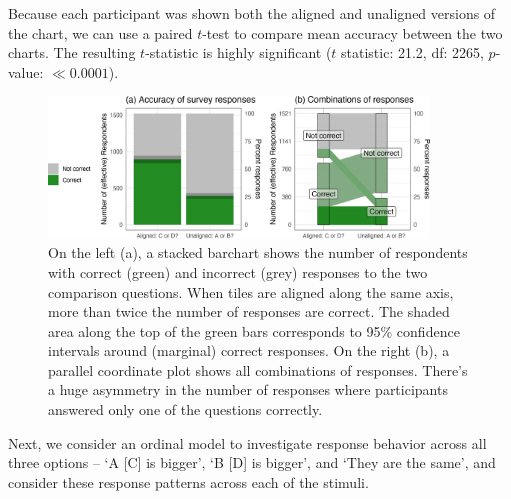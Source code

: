 \documentclass[
]{jds}
\begin{document}
Because each participant was shown both the aligned and unaligned
versions of the chart, we can use a paired \(t\)-test to compare mean
accuracy between the two charts. The resulting \(t\)-statistic is highly
significant (\(t\) statistic: 21.2, df: 2265, \(p\)-value:
\(\ll 0.0001\)).

\begin{figure}[hbt]

{\centering \includegraphics[width=0.9\textwidth,height=\textheight]{./figures/fig-alignment-1.png}

}

\caption{\label{fig-alignment}On the left (a), a stacked barchart shows
the number of respondents with correct (green) and incorrect (grey)
responses to the two comparison questions. When tiles are aligned along
the same axis, more than twice the number of responses are correct. The
shaded area along the top of the green bars corresponds to 95\%
confidence intervals around (marginal) correct responses. On the right
(b), a parallel coordinate plot shows all combinations of responses.
There's a huge asymmetry in the number of responses where participants
answered only one of the questions correctly.}

\end{figure}

Next, we consider an ordinal model to investigate response behavior
across all three options -- `A {[}C{]} is bigger', `B {[}D{]} is
bigger', and `They are the same', and consider these response patterns
across each of the stimuli.
\end{document}
